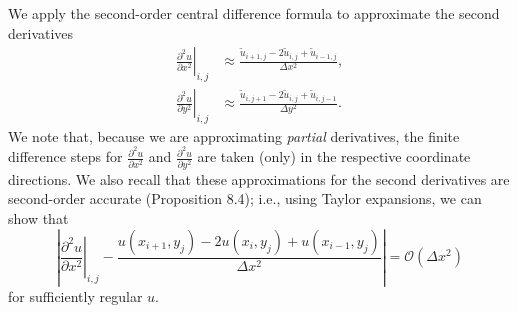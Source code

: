 
We apply the second-order central difference formula to approximate the second derivatives
\begin{align*}
    \left.\frac{\partial^2 u}{\partial x^2}\right|_{i,j} &\approx \frac{\tilde{u}_{i+1,j} - 2\tilde{u}_{i,j} + \tilde{u}_{i-1,j}}{\Delta x^2}, \\
    \left.\frac{\partial^2 u}{\partial y^2}\right|_{i,j} &\approx \frac{\tilde{u}_{i,j+1} - 2\tilde{u}_{i,j} + \tilde{u}_{i,j-1}}{\Delta y^2}.
\end{align*}
We note that, because we are approximating \textit{partial} derivatives, the finite difference steps for $\frac{\partial^2 u}{\partial x^2}$ and $\frac{\partial^2 u}{\partial y^2}$ are taken (only) in the respective coordinate directions. We also recall that these approximations for the second derivatives are second-order accurate (Proposition 8.4); i.e., using Taylor expansions, we can show that
\[\left|\left.\frac{\partial^2 u}{\partial x^2}\right|_{i,j} - \frac{u(x_{i+1}, y_j) - 2u(x_i, y_j) + u(x_{i-1}, y_j)}{\Delta x^2}\right| = \mathcal{O}(\Delta x^2)\]
for sufficiently regular $u$.

